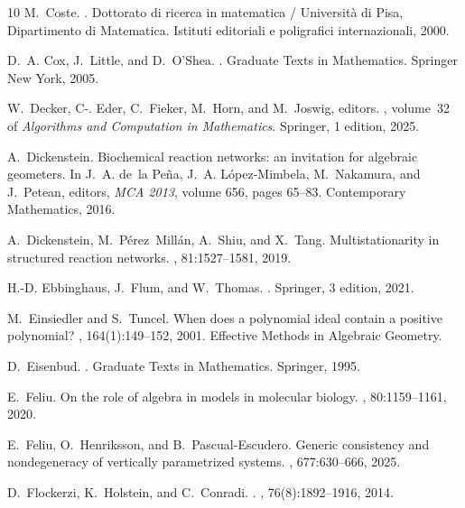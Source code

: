 \documentclass{article}
\theoremstyle{definition}
\begin{document}
{\begin{thebibliography}{10}
M.~Coste.
.
\newblock Dottorato di ricerca in matematica / Universit{\`a} di Pisa, Dipartimento di Matematica. Istituti editoriali e poligrafici internazionali, 2000.

D.~A. Cox, J.~Little, and D.~O'Shea.
.
\newblock Graduate Texts in Mathematics. Springer New York, 2005.

W.~Decker, C-. Eder, C.~Fieker, M.~Horn, and M.~Joswig, editors.
, volume~32 of {\em Algorithms and {C}omputation in {M}athematics}.
\newblock Springer, 1 edition, 2025.

A.~Dickenstein.
\newblock Biochemical reaction networks: an invitation for algebraic geometers.
\newblock In J.~A. de~la Peña, J.~A. López-Mimbela, M.~Nakamura, and J.~Petean, editors, {\em MCA 2013}, volume 656, pages 65--83. Contemporary Mathematics, 2016.

A.~Dickenstein, M.~Pérez~Millán, A.~Shiu, and X.~Tang.
\newblock Multistationarity in structured reaction networks.
, 81:1527–1581, 2019.

H.-D. Ebbinghaus, J.~Flum, and W.~Thomas.
.
\newblock Springer, 3 edition, 2021.

M.~Einsiedler and S.~Tuncel.
\newblock When does a polynomial ideal contain a positive polynomial?
, 164(1):149--152, 2001.
\newblock Effective Methods in Algebraic Geometry.

D.~Eisenbud.
.
\newblock Graduate Texts in Mathematics. Springer, 1995.

E.~Feliu.
\newblock On the role of algebra in models in molecular biology.
, 80:1159–1161, 2020.

E.~Feliu, O.~Henriksson, and B.~Pascual-Escudero.
\newblock Generic consistency and nondegeneracy of vertically parametrized systems.
, 677:630--666, 2025.

D.~Flockerzi, K.~Holstein, and C.~Conradi.
.
, 76(8):1892--1916, 2014.


\end{thebibliography}}
\end{document}
